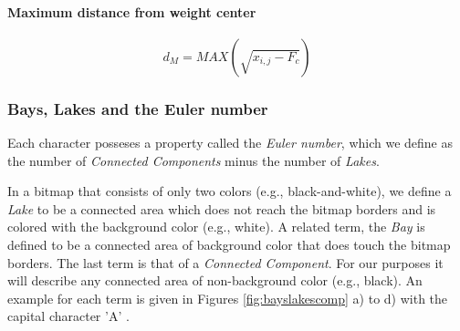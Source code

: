 \documentclass{article}
\begin{document}
\paragraph{Maximum distance from weight center}
\begin{equation}
	d_M = MAX(\sqrt{x_{i,j}-F_c})
\end{equation}

\subsubsection{Bays, Lakes and the Euler number}
\label{sec:lakeseuler}
Each character posseses a property called the \textit{Euler number}, which we define as the number of \textit{Connected Components} minus the number of \textit{Lakes}.

In a bitmap that consists of only two colors (e.g., black-and-white), we define a \textit{Lake} to be a connected area which does not reach the bitmap borders and is colored with the background color (e.g., white). A related term, the \textit{Bay} is defined to be a connected area of background color that does touch the bitmap borders. The last term is that of a \textit{Connected Component}. For our purposes it will describe any connected area of non-background color (e.g., black). An example for each term is given in Figures \ref{fig:bayslakescomp} a) to d) with the capital character 'A' .
\end{document}
